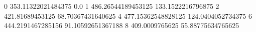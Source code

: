 0 353.11322021484375 0.0
1 486.26544189453125 133.1522216796875
2 421.81689453125 68.70367431640625
4 477.15362548828125 124.0404052734375
6 444.2191467285156 91.10592651367188
8 409.0009765625 55.88775634765625
